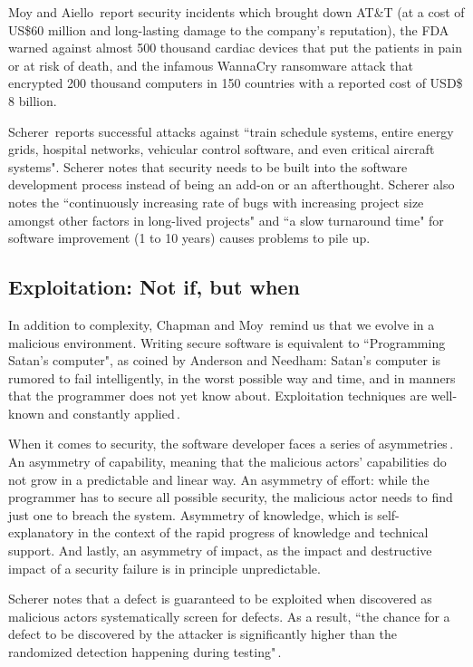 \documentclass[nomenclature, english, bibtex]{kththesis}
\begin{document}
Moy and Aiello\,\cite{moy_when_2020} report security incidents which brought down AT\&T (at a cost of US\$60 million and long-lasting damage to the company's reputation), the \gls{FDA} warned against almost 500 thousand cardiac devices that put the patients in pain or at risk of death, and the infamous WannaCry ransomware attack that encrypted 200 thousand computers in 150 countries with a reported cost of USD\$ 8 billion.

Scherer\,\cite{scherer_engineering_2021} reports successful attacks against ``train schedule systems, entire energy grids, hospital networks, vehicular control software, and even critical aircraft systems". Scherer notes that security needs to be built into the software development process instead of being an add-on or an afterthought. Scherer also notes the ``continuously increasing rate of bugs with increasing project size amongst other factors in long-lived projects" and ``a slow turnaround time" for software improvement (1 to 10 years) causes problems to pile up.

\subsection{Exploitation: Not if, but when}
\label{sec:exploitationwhen}

In addition to complexity, Chapman and Moy\,\cite{chapman_adacore_2018} remind us that we evolve in a malicious environment. Writing secure software is equivalent to ``Programming Satan’s computer", as coined by Anderson and Needham: Satan’s computer is rumored to fail intelligently, in the worst possible way and time, and in manners that the programmer does not yet know about. Exploitation techniques are well-known and constantly applied\,\cite{pal_memory_2016}.

When it comes to security, the software developer faces a series of asymmetries\,\cite{chapman_adacore_2018}. An asymmetry of capability, meaning that the malicious actors' capabilities do not grow in a predictable and linear way. An asymmetry of effort: while the programmer has to secure all possible security, the malicious actor needs to find just one to breach the system. Asymmetry of knowledge, which is self-explanatory in the context of the rapid progress of knowledge and technical support. And lastly, an asymmetry of impact, as the impact and destructive impact of a security failure is in principle unpredictable. 

Scherer notes that a defect is guaranteed to be exploited when discovered as malicious actors systematically screen for defects. As a result, ``the chance for a defect to be discovered by the attacker is significantly higher than the randomized detection happening during testing"\,\cite{scherer_engineering_2021}.
\end{document}
